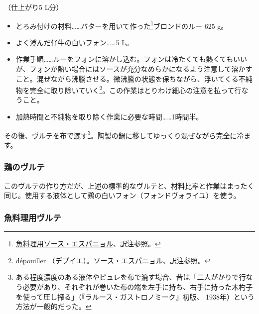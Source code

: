 \begin{recette}
（仕上がり5 L分）

\begin{itemize}
\item
  とろみ付けの材料\ldots{}\ldots{}バターを用いて作った\footnote{\protect\hyperlink{sauce-espagnole-maigre}{魚料理用ソース・エスパニョル}、訳注参照。}ブロンドのルー
  625 g。
\item
  よく澄んだ仔牛の白いフォン\ldots{}\ldots{}5 L。
\item
  作業手順\ldots{}\ldots{}ルーをフォンに溶かし込む。フォンは冷たくても熱くてもいいが、フォンが熱い場合にはソースが充分なめらかになるよう注意して溶かすこと。混ぜながら沸騰させる。微沸騰の状態を保ちながら、浮いてくる不純物を完全に取り除いていく\footnote{dépouiller
    （デプイエ）。\protect\hyperlink{sauce-espagnole}{ソース・エスパニョル}、訳注参照。}。この作業はとりわけ細心の注意を払って行なうこと。
\item
  加熱時間と不純物を取り除く作業に必要な時間\ldots{}\ldots{}1時間半。
\end{itemize}

その後、ヴルテを布で漉す\footnote{ある程度濃度のある液体やピュレを布で漉す場合、昔は「二人がかりで行なう必要があり、それぞれが巻いた布の端を左手に持ち、右手に持った木杓子を使って圧し搾る」（『ラルース・ガストロノミーク』初版、
  1938年）という方法が一般的だった。}。陶製の鍋に移してゆっくり混ぜながら完全に冷ます。

\hypertarget{veloute-de-volaille}{%
\subsubsection{鶏のヴルテ}\label{veloute-de-volaille}}


 

このヴルテの作り方だが、上述の標準的なヴルテと、材料比率と作業はまったく同じ。使用する液体として鶏の白いフォン（フォンドヴォライユ）を使う。

\hypertarget{veloute-de-poisson}{%
\subsubsection{魚料理用ヴルテ}\label{veloute-de-poisson}}


\end{recette}
